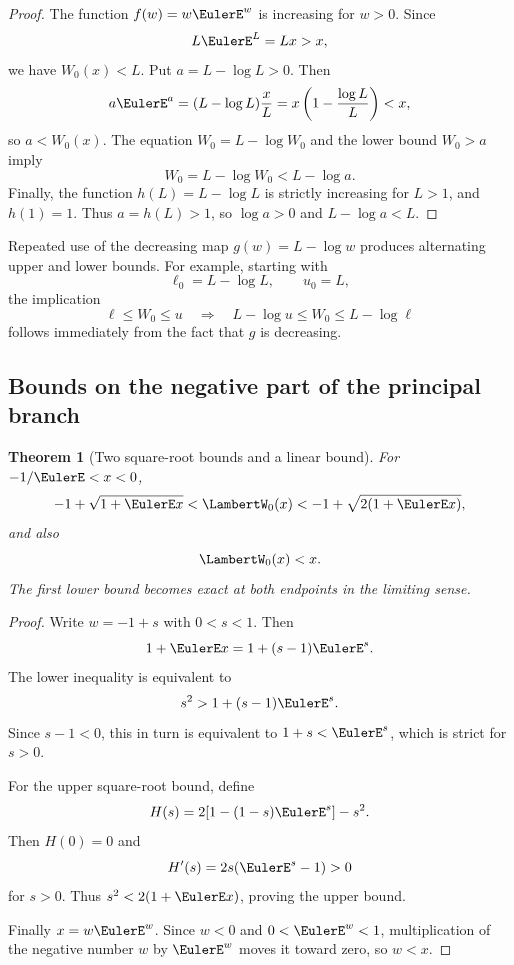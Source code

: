 \documentclass[11pt]{article}
\newtheorem{theorem}{Theorem}[section]
\theoremstyle{remark}
\newcommand{\Wz}{\LambertW_{0}}
\begin{document}
\begin{proof}
The function \(f(w)=w\EulerE^w\) is increasing for \(w>0\).  Since
\[
       L\EulerE^L=Lx>x,
\]
we have \(W_0(x)<L\).  Put \(a=L-\log L>0\).  Then
\[
       a\EulerE^a
       =(L-\log L)\frac{x}{L}
       =x\left(1-\frac{\log L}{L}\right)<x,
\]
so \(a<W_0(x)\).  The equation \(W_0=L-\log W_0\) and the lower bound
\(W_0>a\) imply
\[
       W_0=L-\log W_0<L-\log a.
\]
Finally, the function \(h(L)=L-\log L\) is strictly increasing for
\(L>1\), and \(h(1)=1\).  Thus \(a=h(L)>1\), so \(\log a>0\) and
\(L-\log a<L\).
\end{proof}

Repeated use of the decreasing map \(g(w)=L-\log w\) produces alternating
upper and lower bounds.  For example, starting with
\[
       \ell_0=L-\log L,\qquad u_0=L,
\]
the implication
\[
       \ell\leq W_0\leq u
       \quad\Longrightarrow\quad
       L-\log u\leq W_0\leq L-\log\ell
\]
follows immediately from the fact that \(g\) is decreasing.

\subsection{Bounds on the negative part of the principal branch}

\begin{theorem}[Two square-root bounds and a linear bound]\label{thm:W0negativebounds}
For \(-1/\EulerE<x<0\),
\begin{equation}\label{eq:W0negativebounds}
 -1+\sqrt{1+\EulerE x}
 <\Wz(x)
 <-1+\sqrt{2(1+\EulerE x)},
\end{equation}
and also
\begin{equation}\label{eq:W0xbound}
       \Wz(x)<x.
\end{equation}
The first lower bound becomes exact at both endpoints in the limiting sense.
\end{theorem}

\begin{proof}
Write \(w=-1+s\) with \(0<s<1\).  Then
\[
       1+\EulerE x=1+(s-1)\EulerE^s.
\]
The lower inequality is equivalent to
\[
       s^2>1+(s-1)\EulerE^s.
\]
Since \(s-1<0\), this in turn is equivalent to
\(1+s<\EulerE^s\), which is strict for \(s>0\).

For the upper square-root bound, define
\[
 H(s)=2[1-(1-s)\EulerE^s]-s^2.
\]
Then \(H(0)=0\) and
\[
       H'(s)=2s(\EulerE^s-1)>0
\]
for \(s>0\).  Thus
\(s^2<2(1+\EulerE x)\), proving the upper bound.

Finally \(x=w\EulerE^w\).  Since \(w<0\) and \(0<\EulerE^w<1\), multiplication of
the negative number \(w\) by \(\EulerE^w\) moves it toward zero, so \(w<x\).
\end{proof}
\end{document}

